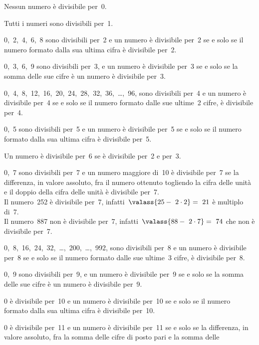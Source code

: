 \begin{description} [noitemsep]
\item[\textbf{0}:~] Nessun numero è divisibile per~0.
\item[\textbf{1}:~] Tutti i numeri sono divisibili per~1.
\item[\textbf{2}:~] 0,~2,~4,~6,~8 sono divisibili per~2 
e un numero è divisibile per~2 se e solo se il numero formato dalla sua 
ultima cifra è divisibile per~2.
\item[\textbf{3}:~] 0,~3,~6,~9 sono divisibili per~3,
e un numero è divisibile per~3 se e solo se la somma delle sue cifre è un 
numero è divisibile per~3.
\item[\textbf{4}:~] 0,~4,~8,~12,~16,~20,~24,~28,~32,~36,~\dots,~96,
sono divisibili per~4 
e un numero è divisibile per~4 se e solo se il numero formato dalle sue 
ultime~2 cifre, è divisibile per~4.
\item[\textbf{5}:~] 0,~5 sono divisibili per~5 
e un numero è divisibile per~5 se e solo se il numero formato dalla sua 
ultima cifra è divisibile per~5.
\item[\textbf{6}:~] Un numero è divisibile per~6 se è divisibile 
per~2 e per~3.
\item[\textbf{7}:~] 0,~7 sono divisibili per~7 
e un numero maggiore di~10 è divisibile per~7 se la differenza, 
in valore assoluto, fra il numero ottenuto togliendo la cifra delle unità 
e il doppio della cifra delle unità è divisibile per~7.\\
Il numero~252 è divisibile per~7, infatti~\( \valass{25 -~2\cdot 2}=~21\) è 
multiplo di~7.\\
Il numero~887 non è divisibile per~7, infatti~\(\valass{88 -~2\cdot 7}=~74\) 
che non è divisibile per~7.
\item[\textbf{8}:~] 0,~8,~16,~24,~32,~\dots,~200,~\dots,~992, sono 
divisibili per~8 
e un numero è divisibile per~8 se e solo se il numero formato dalle sue 
ultime~3 cifre, è divisibile per~8.
\item[\textbf{9}:~] 0,~9 sono divisibili per~9,
e un numero è divisibile per~9 se e solo se la somma delle sue cifre è un 
numero è divisibile per~9.
\item[\textbf{10}:~] 0 è divisibile per~10 
e un numero è divisibile per~10 se e solo se il numero formato dalla sua 
ultima cifra è divisibile per~10.
\item[\textbf{11}:~] 0 è divisibile per~11
e un numero è divisibile per~11 se e solo se la differenza, 
in valore assoluto, fra la somma delle cifre di posto pari e la somma delle 

\end{description}
